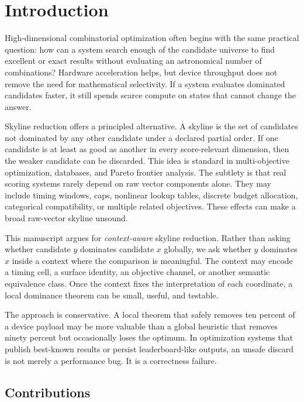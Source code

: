 \documentclass[11pt,oneside]{article}
\theoremstyle{definition}
\begin{document}
\section{Introduction}

High-dimensional combinatorial optimization often begins with the same practical question: how can a system search enough of the candidate universe to find excellent or exact results without evaluating an astronomical number of combinations? Hardware acceleration helps, but device throughput does not remove the need for mathematical selectivity. If a system evaluates dominated candidates faster, it still spends scarce compute on states that cannot change the answer.

Skyline reduction offers a principled alternative. A skyline is the set of candidates not dominated by any other candidate under a declared partial order. If one candidate is at least as good as another in every score-relevant dimension, then the weaker candidate can be discarded. This idea is standard in multi-objective optimization, databases, and Pareto frontier analysis. The subtlety is that real scoring systems rarely depend on raw vector components alone. They may include timing windows, caps, nonlinear lookup tables, discrete budget allocation, categorical compatibility, or multiple related objectives. These effects can make a broad raw-vector skyline unsound.

This manuscript argues for \emph{context-aware} skyline reduction. Rather than asking whether candidate \(y\) dominates candidate \(x\) globally, we ask whether \(y\) dominates \(x\) inside a context where the comparison is meaningful. The context may encode a timing cell, a surface identity, an objective channel, or another semantic equivalence class. Once the context fixes the interpretation of each coordinate, a local dominance theorem can be small, useful, and testable.

The approach is conservative. A local theorem that safely removes ten percent of a device payload may be more valuable than a global heuristic that removes ninety percent but occasionally loses the optimum. In optimization systems that publish best-known results or persist leaderboard-like outputs, an unsafe discard is not merely a performance bug. It is a correctness failure.

\subsection{Contributions}
\end{document}
